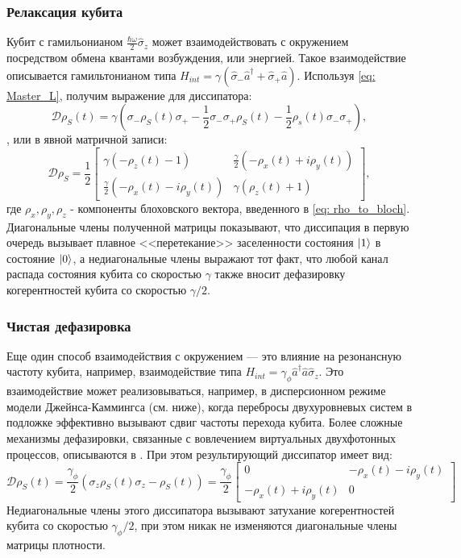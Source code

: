 \subsubsection{Релаксация кубита}
Кубит с гамильонианом $\frac{\hbar \omega}{2}\hat{\sigma}_z$ может взаимодействовать с окружением посредством обмена квантами возбуждения, или энергией. Такое взаимодействие описывается гамильтонианом типа $H_{int} =\gamma(\hat{\sigma}_- \hat{a}^\dag + \hat{\sigma}_+ \hat{a})$. Используя \eqref{eq: Master_L}, получим выражение для диссипатора:
\begin{equation}
\mathcal{D}\rho_S(t) = \gamma\left( \sigma_- \rho_S(t) \sigma_+ -\frac{1}{2}\sigma_-\sigma_+\rho_S(t) -\frac{1}{2}\rho_s(t)\sigma_-\sigma_+ \right),
\label{eq: diss_ops}
\end{equation}
, или в явной матричной записи:
\begin{equation}
\mathcal{D}\rho_S = \frac{1}{2}\left[\begin{matrix}\gamma \left(- \rho_{z}{\left (t \right )} - 1\right) & \frac{\gamma}{2} \left(- \rho_{x}{\left (t \right )} + i \rho_{y}{\left (t \right )}\right)\\\frac{\gamma}{2} \left(- \rho_{x}{\left (t \right )} - i \rho_{y}{\left (t \right )}\right) & \gamma \left(\rho_{z}{\left (t \right )} + 1\right)\end{matrix}\right],
\label{eq: diss}
\end{equation}
где $\rho_x, \rho_y, \rho_z$ - компоненты блоховского вектора, введенного в \eqref{eq: rho_to_bloch}. Диагональные члены полученной матрицы показывают, что диссипация в первую очередь вызывает плавное <<перетекание>> заселенности состояния $\ket{1}$ в состояние $\ket{0}$, а недиагональные члены выражают тот факт, что любой канал распада состояния кубита со скоростью $\gamma$ также вносит дефазировку когерентностей кубита со скоростью $\gamma/2$. 
\subsubsection{Чистая дефазировка}
Еще один способ взаимодействия с окружением --- это влияние на резонансную частоту кубита, например, взаимодействие типа $H_{int} = \gamma_{\phi}\hat{a}^\dag\hat{a}\hat{\sigma}_z$. Это взаимодействие может реализовываться, например, в дисперсионном режиме модели Джейнса-Каммингса (см. ниже), когда перебросы двухуровневых систем в подложке эффективно вызывают сдвиг частоты перехода кубита. Более сложные механизмы дефазировки, связанные с вовлечением виртуальных двухфотонных процессов, описываются в \cite{Carmichael}. При этом результирующий диссипатор имеет вид:
\begin{equation}
\mathcal{D}\rho_S(t) = \frac{\gamma_\phi}{2}\left( \sigma_z\rho_S(t)\sigma_z - \rho_S(t)\right) = \frac{\gamma_\phi}{2}\left[\begin{matrix}0 & - \rho_{x}{\left (t \right )} - i \rho_{y}{\left (t \right )}\\-  \rho_{x}{\left (t \right )} + i \rho_{y}{\left (t \right )} & 0\end{matrix}\right]
\end{equation}
Недиагональные члены этого диссипатора вызывают затухание когерентностей кубита со скоростью $\gamma_\phi/2$, при этом никак не изменяются диагональные члены матрицы плотности. 
